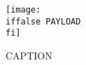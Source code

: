 \begin{figure}[h!]
\centering
\texttt{[image: \\iffalse PAYLOAD \\fi]}
\caption{CAPTION}
\end{figure}
